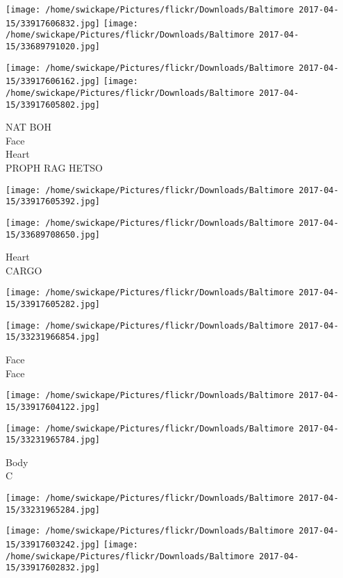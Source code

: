 \documentclass[10pt,letterpaper]{article}
\begin{document}
\texttt{[image: /home/swickape/Pictures/flickr/Downloads/Baltimore 2017-04-15/33917606832.jpg]}
\texttt{[image: /home/swickape/Pictures/flickr/Downloads/Baltimore 2017-04-15/33689791020.jpg]}

\texttt{[image: /home/swickape/Pictures/flickr/Downloads/Baltimore 2017-04-15/33917606162.jpg]}
\texttt{[image: /home/swickape/Pictures/flickr/Downloads/Baltimore 2017-04-15/33917605802.jpg]}

NAT BOH\\
Face\\
Heart\\
PROPH RAG HETSO\\
\pagebreak

\texttt{[image: /home/swickape/Pictures/flickr/Downloads/Baltimore 2017-04-15/33917605392.jpg]}

\vspace{0.25in}
\texttt{[image: /home/swickape/Pictures/flickr/Downloads/Baltimore 2017-04-15/33689708650.jpg]}

Heart\\
CARGO\\
\pagebreak

\texttt{[image: /home/swickape/Pictures/flickr/Downloads/Baltimore 2017-04-15/33917605282.jpg]}

\vspace{0.25in}
\texttt{[image: /home/swickape/Pictures/flickr/Downloads/Baltimore 2017-04-15/33231966854.jpg]}

Face\\
Face\\
\pagebreak

\texttt{[image: /home/swickape/Pictures/flickr/Downloads/Baltimore 2017-04-15/33917604122.jpg]}

\vspace{0.25in}
\texttt{[image: /home/swickape/Pictures/flickr/Downloads/Baltimore 2017-04-15/33231965784.jpg]}

Body\\
C\\
\pagebreak

\texttt{[image: /home/swickape/Pictures/flickr/Downloads/Baltimore 2017-04-15/33231965284.jpg]}

\vspace{0.25in}
\texttt{[image: /home/swickape/Pictures/flickr/Downloads/Baltimore 2017-04-15/33917603242.jpg]}
\texttt{[image: /home/swickape/Pictures/flickr/Downloads/Baltimore 2017-04-15/33917602832.jpg]}
\end{document}
